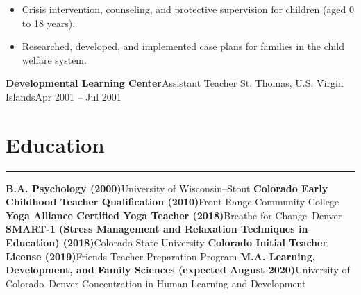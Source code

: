\documentclass[letterpaper,10pt]{article}
\newcommand{\mblue}{\color{darkblue}}
\begin{document}
\begin{itemize}
    \item Crisis intervention, counseling, and protective supervision for children (aged 0 to 18 years).
    \item Researched, developed, and implemented case plans for families in the child welfare system.
\end{itemize}

\vspace{1pc}
\textbf{Developmental Learning Center}\hfill Assistant Teacher
\smallbreak St. Thomas, U.S. Virgin Islands\hfill Apr 2001 -- Jul 2001


\section*{\mblue Education}

\vspace{-2.15pc}
{\hfill\mblue\rule{5.845in}{0.02cm}}

\vspace{1pc}
\textbf{B.A. Psychology (2000)}\hfill University of Wisconsin--Stout
\bigbreak\textbf{Colorado Early Childhood Teacher Qualification (2010)}\hfill Front Range Community College
\bigbreak\textbf{Yoga Alliance Certified Yoga Teacher (2018)}\hfill Breathe for Change--Denver
\bigbreak\textbf{SMART-1 (Stress Management and Relaxation Techniques in Education) (2018)}\hfill Colorado State University
\bigbreak\textbf{Colorado Initial Teacher License (2019)}\hfill Friends Teacher Preparation Program
\bigbreak\textbf{M.A. Learning, Development, and Family Sciences (expected August 2020)}\hfill University of Colorado--Denver
\smallbreak Concentration in Human Learning and Development
\end{document}
